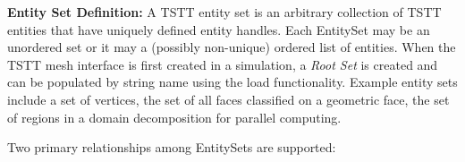 
{\bf Entity Set Definition:} A TSTT entity set is an arbitrary
collection of TSTT entities that have uniquely defined entity handles.
Each EntitySet may be an unordered set or it
may a (possibly non-unique) ordered list of entities.  When the TSTT
mesh interface is first created in a simulation, a {\it Root Set} is
created and can be populated by string name using the load
functionality.  Example entity sets include a set of vertices, the set
of all faces classified on a geometric face, the set of regions in a
domain decomposition for parallel computing.%



Two primary relationships among EntitySets are supported:

